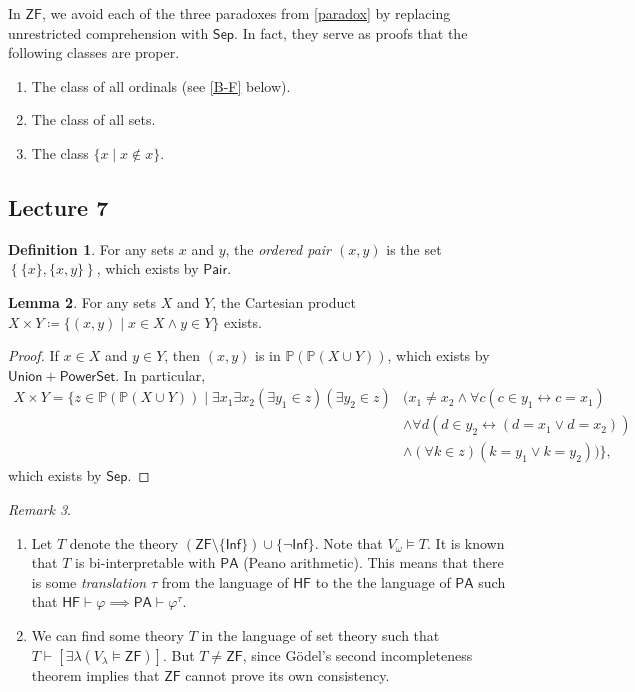\documentclass[10pt,letterpaper,cm]{nupset}
\theoremstyle{definition}
\newtheorem{definition}{Definition}[subsection]
\theoremstyle{theorem}
\newtheorem{lemma}[definition]{Lemma}
\theoremstyle{remark}
\newtheorem{remark}[definition]{Remark}
\renewcommand{\P}{\mathbb P}
\newcommand{\1}{\mathbf{1}}
\newcommand{\0}{\vec 0}
\newcommand{\zf}{\mathsf{ZF}}
\begin{document}
\medskip

In $\zf$, we avoid each of the three paradoxes from \cref{paradox} by replacing unrestricted comprehension with $\mathsf{Sep}$. In fact, they serve as proofs that the following classes are proper. 
\begin{enumerate}
\item The class of all ordinals (see \cref{B-F} below).
 \item The class of all sets.
 \item The class $\{x \mid x \notin x\}$.
 \end{enumerate}


\subsection{Lecture 7}

\begin{definition}
For any sets $x$ and $y$, the \textit{ordered pair $(x,y)$} is the set $\left\{\{x\}, \{x,y\}\right\}$, which exists by $\mathsf{Pair}$.
\end{definition}

\begin{lemma}
 For any sets $X$ and $Y$, the Cartesian product $X \times Y \coloneqq \{(x,y) \mid x \in X \land y \in Y\}$ exists.
\end{lemma}
\begin{proof}
If $x\in X$ and $y\in Y$, then $(x,y)$ is in $\P(\P(X \cup Y))$, which exists by $\mathsf{Union} + \mathsf{PowerSet}$. In particular,
\begin{align*}
X \times Y = \{z \in \P(\P(X \cup Y)) \mid 
\exists x_1 \exists x_2 (\exists y_1\in z)(\exists y_2\in z) &
 (x_1\ne x_2 \land \forall c (c\in y_1 \leftrightarrow c=x_1) 
\\ & \land \forall d(d\in y_2 \leftrightarrow (d = x_1 \vee d=x_2))
\\  & \land (\forall k\in z)(k = y_1 \vee k = y_2))   \}
,\end{align*}
which exists by $\mathsf{Sep}$. 
\end{proof}

\begin{remark} $ $
\begin{enumerate}
\item Let $T$ denote the theory $\left(\zf \setminus \{\mathsf{Inf}\}\right)\cup \{\neg{\mathsf{Inf}}\}$. Note that $V_{\omega} \models T$. It is known that $T$ is bi-interpretable with $\mathsf{PA}$ (Peano arithmetic).  This means that there is some \textit{translation} $\tau$ from the language of $\mathsf{HF}$ to the the language of $\mathsf{PA}$ such that $\mathsf{HF} \vdash \varphi \implies \mathsf{PA} \vdash \varphi^{\tau}$.
\item We can find some theory $T$ in the language of set theory such that $T \vdash [\exists \lambda(V_{\lambda}\models \zf)]$. But $T \ne \zf$, since G\"odel's second incompleteness theorem implies that $\zf$ cannot prove its own consistency. 
\end{enumerate}
\end{remark}
\end{document}
